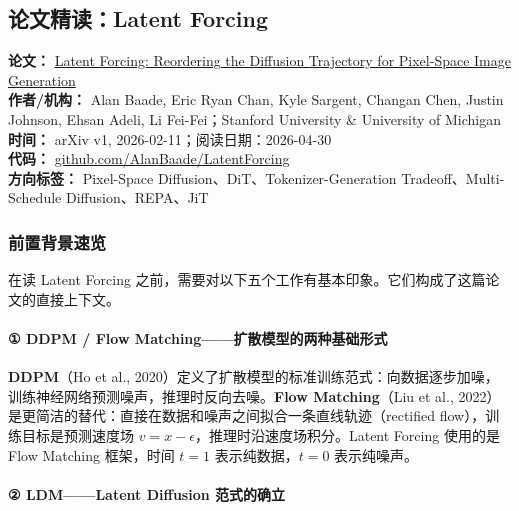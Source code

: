 
\subsection{论文精读：Latent Forcing}

\begin{conceptbox}
\textbf{论文：} \href{https://arxiv.org/abs/2602.11401}{Latent Forcing: Reordering the Diffusion Trajectory for Pixel-Space Image Generation}\\
\textbf{作者/机构：} Alan Baade, Eric Ryan Chan, Kyle Sargent, Changan Chen, Justin Johnson, Ehsan Adeli, Li Fei-Fei；Stanford University \& University of Michigan\\
\textbf{时间：} arXiv v1, 2026-02-11；阅读日期：2026-04-30\\
\textbf{代码：} \href{https://github.com/AlanBaade/LatentForcing}{github.com/AlanBaade/LatentForcing}\\
\textbf{方向标签：} Pixel-Space Diffusion、DiT、Tokenizer-Generation Tradeoff、Multi-Schedule Diffusion、REPA、JiT
\end{conceptbox}

\subsubsection{前置背景速览}

在读 Latent Forcing 之前，需要对以下五个工作有基本印象。它们构成了这篇论文的直接上下文。

\paragraph{① DDPM / Flow Matching——扩散模型的两种基础形式}

\textbf{DDPM}（Ho et al., 2020）定义了扩散模型的标准训练范式：向数据逐步加噪，训练神经网络预测噪声，推理时反向去噪。\textbf{Flow Matching}（Liu et al., 2022）是更简洁的替代：直接在数据和噪声之间拟合一条直线轨迹（rectified flow），训练目标是预测速度场 $v = x - \epsilon$，推理时沿速度场积分。Latent Forcing 使用的是 Flow Matching 框架，时间 $t=1$ 表示纯数据，$t=0$ 表示纯噪声。

\paragraph{② LDM——Latent Diffusion 范式的确立}

